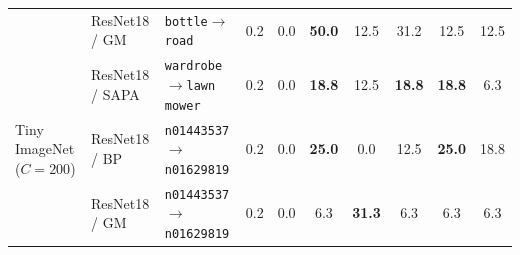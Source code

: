 \begin{table}[h!]
{\begin{tabular}{@{}ll lc cccccc@{}}
  & ResNet18 / GM  & \texttt{bottle}$\rightarrow$\texttt{road}          & 0.2 & {0.0}  & \textbf{50.0}       & 12.5       & {31.2} & 12.5 & 12.5 \\
  & ResNet18 / SAPA& \texttt{wardrobe}$\rightarrow$\texttt{lawn mower}  & 0.2 & {0.0}  & \textbf{18.8} & 12.5       & {\textbf{18.8}} & \textbf{18.8} & 6.3 \\
\midrule
Tiny ImageNet ($C=200$)
  & ResNet18 / BP  & \texttt{n01443537}$\rightarrow$\texttt{n01629819}  & 0.2 & {0.0}  & \textbf{25.0}       & 0.0       & {12.5} & \textbf{25.0} & 18.8 \\
  & ResNet18 / GM  & \texttt{n01443537}$\rightarrow$\texttt{n01629819}  & 0.2 & {0.0}  & 6.3       & \textbf{31.3}       & {6.3}  & 6.3 & 6.3 \\
\bottomrule
\end{tabular}%
}
\end{table}

\bigskip
\begin{table}[h!]
\centering
\vspace{-0.6em}
\small
\setlength{\tabcolsep}{5pt}
\renewcommand{\arraystretch}{1.1}
\end{table}





